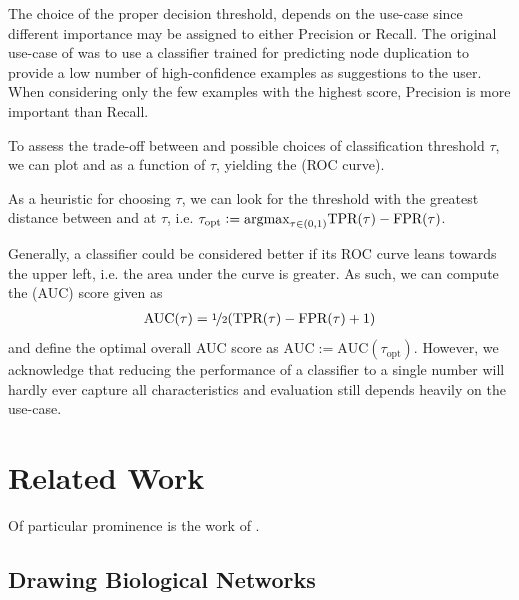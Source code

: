 \documentclass[
	fontsize=10pt, %
	twoside=false, %
	secnumdepth=1, %
  toc=indentunnumbered %
]{kaobook}
\begin{document}
The choice of the proper decision threshold,
depends on the use-case since different importance may be assigned
to either Precision or Recall.
%
The original use-case of \nielsen was to use a classifier trained for predicting
node duplication to provide a low number of high-confidence examples as
suggestions to the user. When considering only the few examples with the highest
score, Precision is more important than Recall.

To assess the trade-off between \FPR and \TPR \wrt possible choices of
classification threshold $\tau$, we can plot \FPR and \TPR as a function of
$\tau$, yielding the  (ROC curve).

As a heuristic for choosing $\tau$, we can look for the threshold with the greatest
distance between \TPR and \FPR at $\tau$, i.e. $\tau_{\text{opt}} := \argmax_{\tau \in
  (0,1)} \TPR(\tau) - \FPR(\tau)$.

Generally, a classifier could be considered better
if its ROC curve leans
towards the upper left, i.e. the area under the curve is greater. As such, we
can compute the  (AUC) score given as
\begin{align*}
  \text{AUC}(\tau) = \nicefrac{1}{2} (\TPR(\tau) - \FPR(\tau) + 1)
\end{align*}
and define the optimal overall AUC score as $\text{AUC} := \text{AUC}(\tau_{\text{opt}})$.
However, we acknowledge that reducing the performance of a classifier to a
single number will hardly ever capture all characteristics and evaluation still
depends heavily on the use-case.



\chapter{Related Work}
\label{sec:related-work}


Of particular prominence is the work of
\citeauthor{nielsen_MachineLearningSupport_2019}   
\cite{nielsen_MachineLearningSupport_2019}. 

\section{Drawing Biological Networks}
\end{document}
